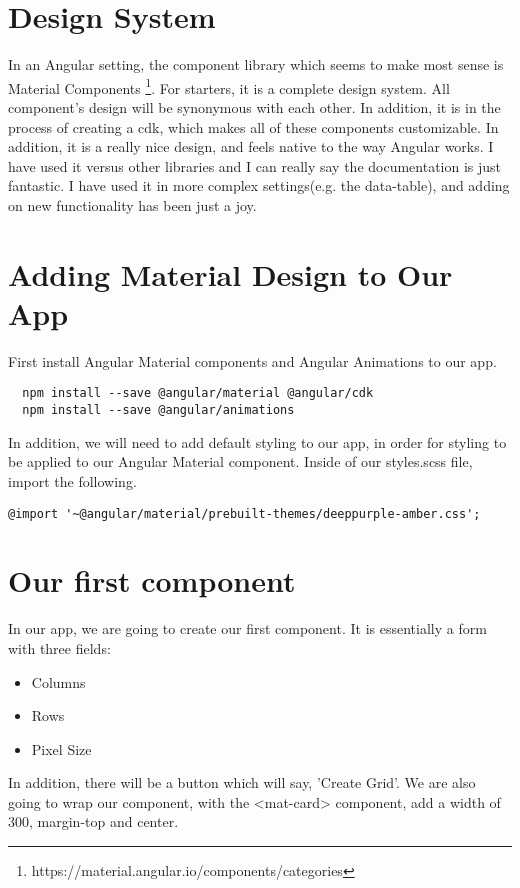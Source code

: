 \section{ Design System }
In an Angular setting, the component library which seems to make most sense is
Material Components
\footnote{https://material.angular.io/components/categories}. For starters, it
is a complete design system. All component's design will be synonymous with
each other. In addition, it is in the process of creating a cdk, which makes
all of these components customizable. In addition, it is a really nice design,
and feels native to the way Angular works. I have used it versus other libraries
and I can really say the documentation is just fantastic. I have used it in more
complex settings(e.g. the data-table), and adding on new functionality has been
just a joy.

\section{ Adding Material Design to Our App }
First install Angular Material components and Angular Animations to our app.
\begin{verbatim}
  npm install --save @angular/material @angular/cdk
  npm install --save @angular/animations
\end{verbatim}

In addition, we will need to add default styling to our app, in order for
styling to be applied to our Angular Material component. Inside of our
styles.scss file, import the following.
\begin{lstlisting}
@import '~@angular/material/prebuilt-themes/deeppurple-amber.css';
\end{lstlisting}

\section{ Our first component }
In our app, we are going to create our first component. It is essentially a form
with three fields:
\begin{itemize}
  \item Columns
  \item Rows
  \item Pixel Size
\end{itemize}

In addition, there will be a button which will say, 'Create Grid'. We are also
going to wrap our component, with the <mat-card> component, add a width of
300, margin-top and center.

